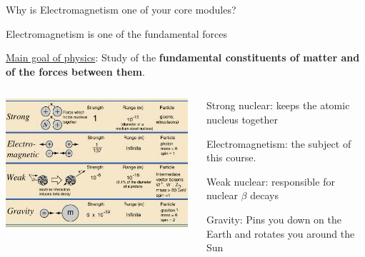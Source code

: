 %
%

\begin{frame}{}
\begin{center}
{\Large Why is Electromagnetism one of your core modules?}
\end{center}
\end{frame}


\begin{frame}{Electromagnetism is one of the fundamental forces}

\underline{Main goal of physics}:
Study of the {\bf fundamental constituents of matter and of the forces between them}.\\
\vspace{0.2cm}

\begin{columns}
  \begin{column}{0.60\textwidth}
   \begin{center}
     \includegraphics[width=0.98\textwidth]{./images/schematics/fundamental_forces.png}\\
   \end{center}
  \end{column}
  \begin{column}{0.40\textwidth}
    \begin{itemize}
    {\small
      \item Strong nuclear: keeps the atomic nucleus together
      \item {\color{magenta}Electromagnetism: the subject of this course.}
      \item Weak nuclear: responsible for nuclear $\beta$ decays
      \item Gravity: Pins you down on the Earth and rotates you around the Sun
    }
    \end{itemize}
  \end{column}
\end{columns}

\end{frame}

